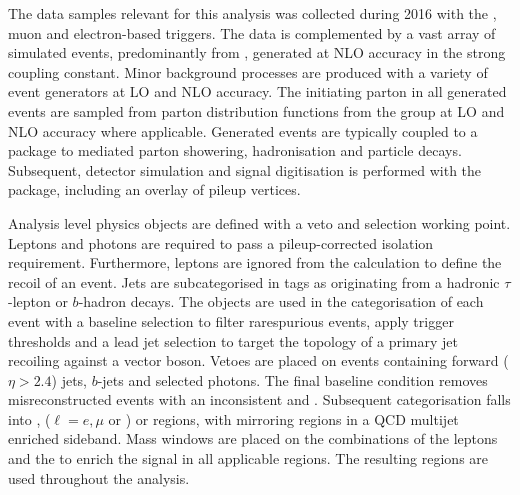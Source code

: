 The data samples relevant for this analysis was collected during 2016 with the
\ptmiss, muon and electron-based triggers. The data is complemented by a vast
array of simulated events, predominantly from \IVj, generated at NLO accuracy
in the strong coupling constant. Minor background processes are produced with
a variety of event generators at LO and NLO accuracy. The initiating parton in
all generated events are sampled from parton distribution functions from the
\NNPDF group at LO and NLO accuracy where applicable. Generated events are
typically coupled to a package to mediated parton showering, hadronisation and
particle decays. Subsequent, detector simulation and signal digitisation is
performed with the \GEANT package, including an overlay of pileup vertices.

Analysis level physics objects are defined with a veto and selection working
point. Leptons and photons are required to pass a pileup-corrected isolation
requirement. Furthermore, leptons are ignored from the \ptmiss calculation to
define the recoil of an event. Jets are subcategorised in tags as originating
from a hadronic $\tau$-lepton or $b$-hadron decays. The objects are used in the
categorisation of each event with a baseline selection to filter rarespurious
\ptmiss events, apply trigger thresholds and a lead jet selection to target
the topology of a primary jet recoiling against a vector boson. Vetoes are
placed on events containing forward (${\eta>2.4}$) jets, $b$-jets and selected
photons. The final baseline condition removes misreconstructed events with an
inconsistent \ptmiss and \ptmisscalo. Subsequent categorisation falls into
\metplusjets, \ellplusjets ($\ell=e,\mu$ or \Ptauh) or \diellplusjets regions,
with mirroring regions in a QCD multijet enriched sideband. Mass windows are
placed on the combinations of the leptons and the \ptmiss to enrich the signal
in all applicable regions. The resulting regions are used throughout the
analysis.